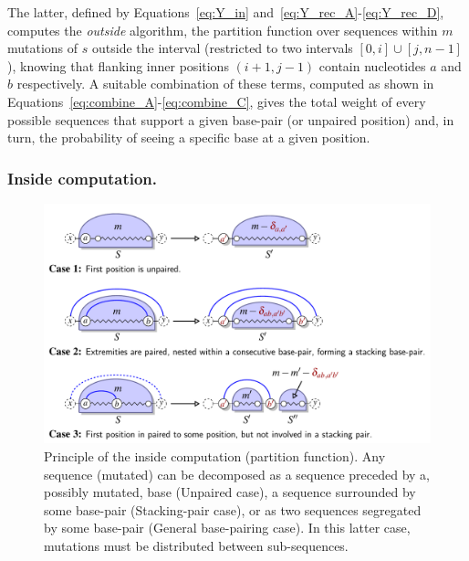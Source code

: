 The latter, defined by Equations~\eqref{eq:Y_in} and~\eqref{eq:Y_rec_A}-\eqref{eq:Y_rec_D},
 computes the \emph{outside} algorithm,   
the partition function over sequences within $m$ mutations of $s$ outside the interval (restricted to two intervals $[0,i]\cup[j,n-1]$), 
knowing  that flanking inner positions $(i+1,j-1)$ contain nucleotides $a$ and $b$ respectively. A suitable combination of these terms, computed as shown in Equations~\eqref{eq:combine_A}-\eqref{eq:combine_C}, gives the total weight of every possible sequences that support a given base-pair (or unpaired position) and, in turn, the probability of seeing a specific base at a given position.





\subsubsection{Inside computation.}
\begin{figure}[t]\centering
\includegraphics[scale=\ScaleDP]{Figure1-FigDPInsideWrapper}
\caption{Principle of the inside computation (partition function). Any sequence (mutated)  
can be decomposed as a sequence preceded by a, possibly mutated, base 
(Unpaired case), a sequence surrounded by some base-pair (Stacking-pair case), 
or as two sequences segregated by some base-pair (General base-pairing case). In this latter case, mutations must be distributed between sub-sequences.\label{fig:inside}}
\end{figure}

